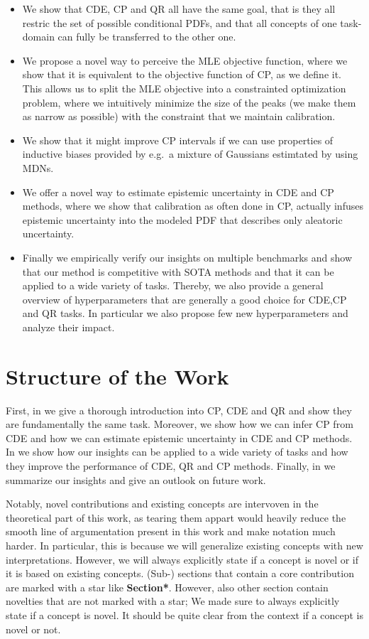 \begin{itemize}
    \item We show that CDE, CP and QR all have the same goal, that is they all restric the set of possible conditional PDFs, and that all concepts of one task-domain can fully be transferred to the other one.
    \item We propose a novel way to perceive the MLE objective function, where we show that it is equivalent to the objective function of CP, as we define it. This allows us to split the MLE objective into a constrainted optimization problem, where we intuitively minimize the size of the peaks (we make them as narrow as possible) with the constraint that we maintain calibration.
    \item We show that it might improve CP intervals if we can use properties of inductive biases provided by e.g.\ a mixture of Gaussians estimtated by using MDNs.
    \item We offer a novel way to estimate epistemic uncertainty in CDE and CP methods, where we show that calibration as often done in CP, actually infuses epistemic uncertainty into the modeled PDF that describes only aleatoric uncertainty.
    \item Finally we empirically verify our insights on multiple benchmarks and show that our method is competitive with SOTA methods and that it can be applied to a wide variety of tasks. Thereby, we also provide a general overview of hyperparameters that are generally a good choice for CDE,CP and QR tasks. In particular we also propose few new hyperparameters and analyze their impact.
\end{itemize}

\section{Structure of the Work}\label{sec:structure}

First, in  we give a thorough introduction into CP, CDE and QR and show they are fundamentally the same task. Moreover, we show how we can infer CP from CDE and how we can estimate epistemic uncertainty in CDE and CP methods. In  we show how our insights can be applied to a wide variety of tasks and how they improve the performance of CDE, QR and CP methods. Finally, in  we summarize our insights and give an outlook on future work.

Notably, novel contributions and existing concepts are intervoven in the theoretical part of this work, as tearing them appart would heavily reduce the smooth line of argumentation present in this work and make notation much harder. In particular, this is because we will generalize existing concepts with new interpretations. However, we will always explicitly state if a concept is novel or if it is based on existing concepts. (Sub-) sections that contain a core contribution are marked with a star like \textbf{Section*}. However, also other section contain novelties that are not marked with a star; We made sure to always explicitly state if a concept is novel. It should be quite clear from the context if a concept is novel or not.

